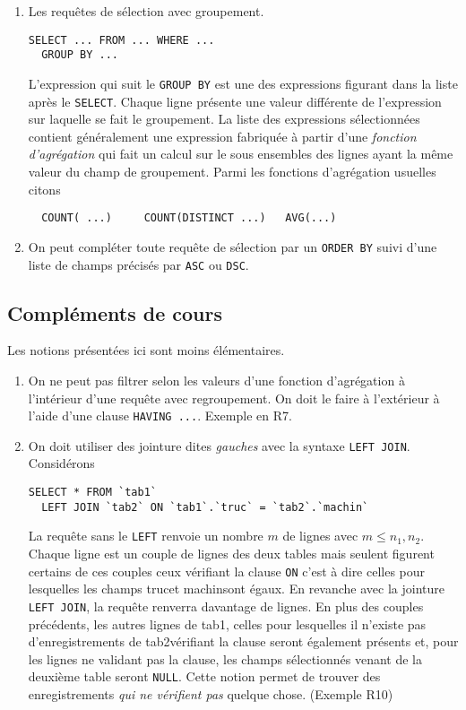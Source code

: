 \begin{enumerate}
\item Les requêtes de sélection avec groupement.
\begin{verbatim}
SELECT ... FROM ... WHERE ...
  GROUP BY ...
\end{verbatim}
L'expression qui suit le \texttt{GROUP BY} est une des expressions figurant dans la liste après le \texttt{SELECT}. Chaque ligne présente une valeur différente de l'expression sur laquelle se fait le groupement. La liste des expressions sélectionnées contient généralement une expression fabriquée à partir d'une \emph{fonction d'agrégation} qui fait un calcul sur le sous ensembles des lignes ayant la même valeur du champ de groupement. Parmi les fonctions d'agrégation usuelles citons
\begin{verbatim}
  COUNT( ...)     COUNT(DISTINCT ...)   AVG(...)    
\end{verbatim}

\item On peut compléter toute requête de sélection par un \texttt{ORDER BY} suivi d'une liste de champs précisés par \texttt{ASC} ou \texttt{DSC}.

\end{enumerate}


\subsection*{Compléments de cours}
Les notions présentées ici sont moins élémentaires.
\begin{enumerate}
  \item On ne peut pas filtrer selon les valeurs d'une fonction d'agrégation à l'intérieur d'une requête avec regroupement.\newline
On doit le faire à l'extérieur à l'aide d'une clause \texttt{HAVING ...}. Exemple en R7.
  \item On doit utiliser des jointure dites \emph{gauches} avec la syntaxe \texttt{LEFT JOIN}. Considérons 
\begin{verbatim}
SELECT * FROM `tab1` 
  LEFT JOIN `tab2` ON `tab1`.`truc` = `tab2`.`machin` 
\end{verbatim}
La requête sans le \texttt{LEFT} renvoie un nombre $m$ de lignes avec $m\leq n_1,n_2$. Chaque ligne est un couple de lignes des deux tables mais seulent figurent certains de ces couples ceux vérifiant la clause  \texttt{ON} c'est à dire celles pour lesquelles les champs \og truc\fg et \og machin\fg sont égaux.\newline
En revanche avec la jointure \texttt{LEFT JOIN}, la requête renverra davantage de lignes. En plus des couples précédents, les autres lignes de \og tab1\fg, celles pour lesquelles il n'existe pas d'enregistrements de \og tab2\fg vérifiant la clause seront également présents et, pour les lignes ne validant pas la clause, les champs sélectionnés venant de la deuxième table seront \texttt{NULL}. Cette notion permet de trouver des enregistrements \emph{qui ne vérifient pas} quelque chose. (Exemple R10) 
\end{enumerate}


